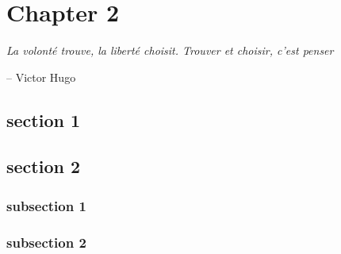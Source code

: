 \chapter{Chapter 2}
\epigraph{\itshape  La volonté trouve, la liberté choisit. Trouver et choisir, c'est penser}{-- Victor Hugo}

\startcontents[chapters]
\printmyminitoc{
	\lipsum[1]
}



\section{section 1}

\lipsum[1] \cite{imagenet_cvpr09}

\lipsum[1] \cite{KrizhevskySH12}

\section{section 2}
\lipsum[2]

\subsection{subsection 1}
\lipsum[1]
\subsection{subsection 2}
\lipsum[1]